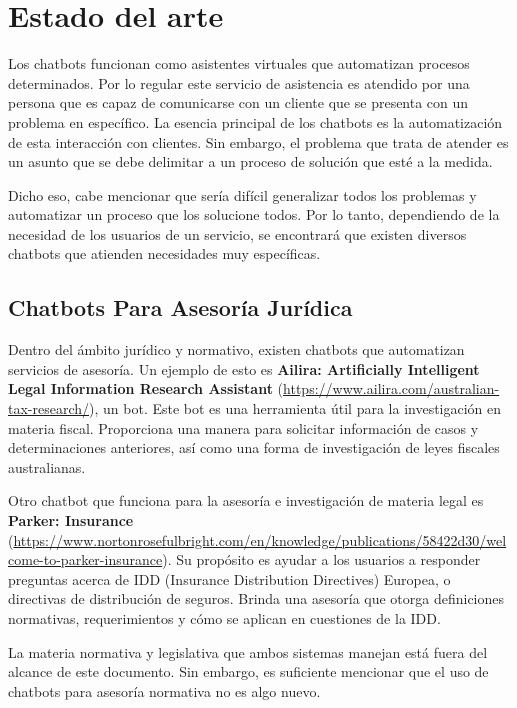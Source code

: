 \chapter{Estado del arte}

Los chatbots funcionan como asistentes virtuales que automatizan procesos determinados. Por lo regular este servicio de asistencia es atendido por una persona que es capaz de comunicarse con un cliente que se presenta con un problema en específico. La esencia principal de los chatbots es la automatización de esta interacción con clientes. Sin embargo, el problema que trata de atender es un asunto que se debe delimitar a un proceso de solución que esté a la medida.

Dicho eso, cabe mencionar que sería difícil generalizar todos los problemas y automatizar un proceso que los solucione todos. Por lo tanto, dependiendo de la necesidad de los usuarios de un servicio, se encontrará que existen diversos chatbots que atienden necesidades muy específicas.

\section{Chatbots Para Asesoría Jurídica}

Dentro del ámbito jurídico y normativo, existen chatbots que automatizan servicios de asesoría. Un ejemplo de esto es \textbf{Ailira: Artificially Intelligent Legal Information Research Assistant} (\url{https://www.ailira.com/australian-tax-research/}), un bot. Este bot es una herramienta útil para la investigación en materia fiscal. Proporciona una manera para solicitar información de casos y determinaciones anteriores, así como una forma de investigación de leyes fiscales australianas.

Otro chatbot que funciona para la asesoría e investigación de materia legal es \textbf{Parker: Insurance} (\url{https://www.nortonrosefulbright.com/en/knowledge/publications/58422d30/welcome-to-parker-insurance}). Su propósito es ayudar a los usuarios a responder preguntas acerca de IDD (Insurance Distribution Directives) Europea, o directivas de distribución de seguros. Brinda una asesoría que otorga definiciones normativas, requerimientos y cómo se aplican en cuestiones de la IDD.

La materia normativa y legislativa que ambos sistemas manejan está fuera del alcance de este documento. Sin embargo, es suficiente mencionar que el uso de chatbots para asesoría normativa no es algo nuevo.

